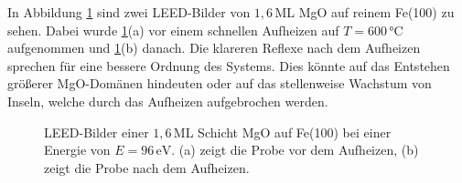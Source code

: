 In Abbildung \ref{fig:LEED2} sind zwei LEED-Bilder von $1,6$\,ML MgO auf reinem Fe(100) zu sehen.
Dabei wurde \ref{fig:LEED2}(a) vor einem schnellen Aufheizen auf $T=600\,\si{\celsius}$ aufgenommen und \ref{fig:LEED2}(b)
danach. Die klareren Reflexe nach dem Aufheizen sprechen für eine bessere Ordnung des Systems.
Dies könnte auf das Entstehen größerer MgO-Domänen hindeuten oder auf das stellenweise Wachstum von Inseln, 
welche durch das Aufheizen aufgebrochen werden.

\begin{figure}[H]
  \centering
  \qquad
  \caption{LEED-Bilder einer $1,6$\,ML Schicht MgO auf Fe(100) bei einer Energie von $E=96\,\si{\eV}$. (a) zeigt die Probe vor dem Aufheizen,
          (b) zeigt die Probe nach dem Aufheizen.}%
  \label{fig:LEED2}
\end{figure}




